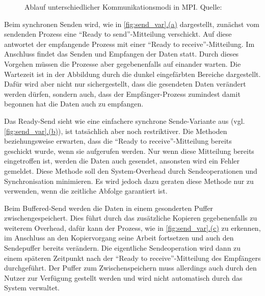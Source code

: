 \begin{figure}[t]
\begin{subfigure}[c]{0.5\textwidth}
	\label{fig:buff_send}
      \end{subfigure}
      \caption{Ablauf unterschiedlicher Kommunikationsmodi in MPI. Quelle: \citet{mpi_p2p}}
      \label{fig:send_var}
    \end{figure}
    
    Beim synchronen Senden wird, wie in \autoref{fig:send_var}\hyperref[fig:sync_send]{.(a)} dargestellt, zunächst vom sendenden Prozess eine ``Ready to send''-Mitteilung verschickt. Auf 
    diese antwortet der empfangende Prozess mit einer ``Ready to receive''-Mitteilung. Im Anschluss findet das Senden und Empfangen der Daten statt. Durch dieses Vorgehen müssen die Prozesse
    aber gegebenenfalls auf einander warten. Die Wartezeit ist in der Abbildung durch die dunkel eingefärbten Bereiche dargestellt. Dafür wird aber nicht nur sichergestellt, dass die gesendeten
    Daten verändert werden dürfen, sondern auch, dass der Empfänger-Prozess zumindest damit begonnen hat die Daten auch zu empfangen. \citep{mpi_p2p, mpiv31}
    
    Das Ready-Send sieht wie eine einfachere synchrone Sende-Variante aus (vgl. \autoref{fig:send_var}\hyperref[fig:ready_send]{.(b)}), ist tatsächlich aber noch restriktiver. Die Methoden 
    beziehungsweise  erwarten, dass die ``Ready to receive''-Mitteilung bereits geschickt wurde, wenn sie aufgerufen werden. Nur wenn diese Mitteilung bereits eingetroffen
    ist, werden die Daten auch gesendet, ansonsten wird ein Fehler gemeldet. Diese Methode soll den System-Overhead durch Sendeoperationen und Synchronisation minimieren. Es wird jedoch 
    dazu geraten diese Methode nur zu verwenden, wenn die zeitliche Abfolge garantiert ist. \citep{mpi_p2p, mpiv31}
    
    Beim Buffered-Send werden die Daten in einem gesonderten Puffer zwischengespeichert. Dies führt durch das zusätzliche Kopieren gegebenenfalls zu weiterem Overhead, dafür kann der 
    Prozess, wie in \autoref{fig:send_var}\hyperref[fig:buff_send]{.(c)} zu erkennen, im Anschluss an den Kopiervorgang seine Arbeit fortsetzen und auch den Sendepuffer bereits verändern. 
    Die eigentliche Sendeoperation wird dann zu einem späteren Zeitpunkt nach der ``Ready to receive''-Mitteilung des Empfängers durchgeführt. Der Puffer zum Zwischenspeichern muss allerdings 
    auch durch den Nutzer zur Verfügung gestellt werden und wird nicht automatisch durch das System verwaltet. \citep{mpi_p2p, mpiv31}
    
